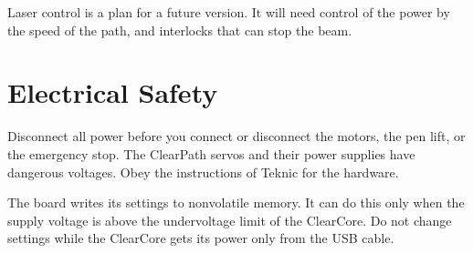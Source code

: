 Laser control is a plan for a future version. It will need control of the
power by the speed of the path, and interlocks that can stop the beam.

\section{Electrical Safety}

\begin{warning}
Disconnect all power before you connect or disconnect the motors, the pen
lift, or the emergency stop. The ClearPath servos and their power supplies
have dangerous voltages. Obey the instructions of Teknic for the hardware.
\end{warning}

\begin{caution}
The board writes its settings to nonvolatile memory. It can do this only
when the supply voltage is above the undervoltage limit of the ClearCore. Do
not change settings while the ClearCore gets its power only from the USB
cable.
\end{caution}
